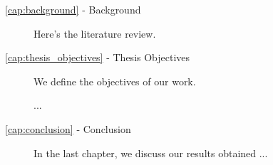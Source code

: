 \begin{description}
    \item[\ref{cap:background} - Background]
Here's the literature review.

    \item[\ref{cap:thesis_objectives} - Thesis Objectives]
We define the objectives of our work.

...

    \item[\ref{cap:conclusion} - Conclusion]
In the last chapter, we discuss our results obtained ...

\end{description}

